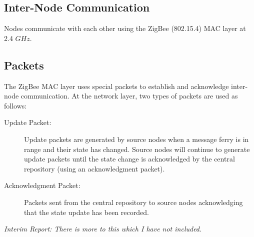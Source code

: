 \subsection{Inter-Node Communication}

Nodes communicate with each other using the ZigBee (802.15.4) MAC layer at 2.4 $GHz$. 


\subsection{Packets}

The ZigBee MAC layer uses special packets to establish and acknowledge inter-node communication.
At the network layer, two types of packets are used as follows:

\begin{description}
\item[Update Packet: ]
Update packets are generated by source nodes when a message ferry is in range and their state has changed. 
Source nodes will continue to generate update packets until the state change is acknowledged by the central repository (using an acknowledgment packet).
\item[Acknowledgment Packet: ] 
Packets sent from the central repository to source nodes acknowledging that the state update has been recorded.
\end{description}

\emph{Interim Report: There is more to this which I have not included.}